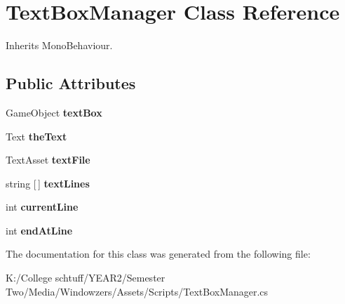 \hypertarget{class_text_box_manager}{}\section{Text\+Box\+Manager Class Reference}
\label{class_text_box_manager}


Inherits Mono\+Behaviour.

\subsection*{Public Attributes}
\begin{DoxyCompactItemize}
\item 
\mbox{\label{class_text_box_manager_a579b4027fc98d6aed9705faedeb30967}} 
Game\+Object {\bfseries text\+Box}
\item 
\mbox{\label{class_text_box_manager_a3aa8736d29b1ed45e0945629a013591a}} 
Text {\bfseries the\+Text}
\item 
\mbox{\label{class_text_box_manager_a86e40205b1af908ebdbcc1dfbdba5d79}} 
Text\+Asset {\bfseries text\+File}
\item 
\mbox{\label{class_text_box_manager_ae7cbab7dd3ad360aa55f6cb1e079b8a0}} 
string \mbox{[}$\,$\mbox{]} {\bfseries text\+Lines}
\item 
\mbox{\label{class_text_box_manager_a017048af8aa978304947b903ce876f5e}} 
int {\bfseries current\+Line}
\item 
\mbox{\label{class_text_box_manager_a8dbc1ef1898f89746a3596747d22d796}} 
int {\bfseries end\+At\+Line}
\end{DoxyCompactItemize}


The documentation for this class was generated from the following file\+:\begin{DoxyCompactItemize}
\item 
K\+:/\+College schtuff/\+Y\+E\+A\+R2/\+Semester Two/\+Media/\+Windowzers/\+Assets/\+Scripts/Text\+Box\+Manager.\+cs\end{DoxyCompactItemize}

